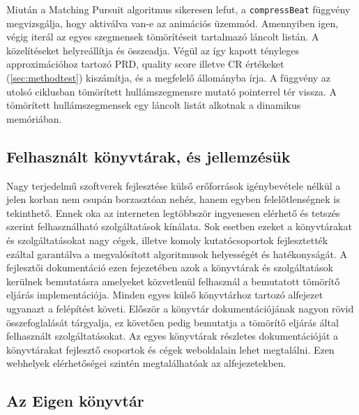 \documentclass[oneside,titlepage,12pt,a4paper]{report}
\begin{document}
\par Miután a Matching Pursuit algoritmus sikeresen lefut, a \texttt{compressBeat} függvény megvizsgálja, hogy aktiválva van-e az animációs üzemmód. Amennyiben igen, végig iterál az egyes szegmensek tömörítéseit tartalmazó láncolt listán. A közelítéseket helyreállítja és összeadja. Végül az így kapott tényleges approximációhoz tartozó PRD, quality score illetve CR értékeket (\ref{sec:methodtest}) kiszámítja, és a megfelelő állományba írja. A függvény az utolsó ciklusban tömörített hullámszegmensre mutató pointerrel tér vissza. A tömörített hullámszegmensek egy láncolt listát alkotnak a dinamikus memóriában. 

\subsection{Felhasznált könyvtárak, és jellemzésük} \label{subsec::external}

Nagy terjedelmű szoftverek fejlesztése külső erőforrások igénybevétele nélkül a jelen korban nem csupán borzasztóan nehéz, hanem egyben felelőtlenségnek is tekinthető. Ennek oka az interneten legtöbbször ingyenesen elérhető és tetszés szerint felhasználható szolgáltatások kínálata. Sok esetben ezeket a könyvtárakat és szolgáltatásokat nagy cégek, illetve komoly kutatócsoportok fejlesztették ezáltal garantálva a megvalósított algoritmusok helyességét és hatékonyságát. A fejlesztői dokumentáció ezen fejezetében azok a könyvtárak és szolgáltatások kerülnek bemutatásra amelyeket közvetlenül felhasznál a bemutatott tömörítő eljárás implementációja. Minden egyes külső könyvtárhoz tartozó alfejezet ugyanazt a felépítést követi. Először a könyvtár dokumentációjának nagyon rövid összefoglalását tárgyalja, ez követően pedig  bemutatja a tömörítő eljárás által felhasznált szolgáltatásokat. Az egyes könyvtárak részletes dokumentációját a könyvtárakat fejlesztő csoportok és cégek weboldalain lehet megtalálni. Ezen webhelyek elérhetőségei szintén megtalálhatóak az alfejezetekben. 

\subsection*{Az Eigen könyvtár}
\end{document}
